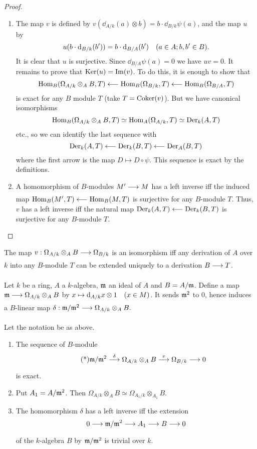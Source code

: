 \documentclass[../main]{subfiles}
\begin{document}
\begin{proof}
\begin{enumerate}
    \item The map $v$ is defined by $v(\dd_{A / k}(a) \otimes b)=b \cdot \dd_{B / k} \psi(a)$, and the map $u$ by \[u(b \cdot \dd_{B / k}(b'))=b \cdot \dd_{B / A}(b')\for{a \in A ; b, b' \in B}.\] It is clear that $u$ is surjective. Since $\dd_{B / A} \psi(a)=0$ we have $u v=0$. It remains to prove that $\operatorname{Ker}(u)=\operatorname{Im}(v)$. To do this, it is enough to show that \[\operatorname{Hom}_B(\Omega_{A/k} \otimes_A B, T)\longleftarrow\operatorname{Hom}_B(\Omega_{B/ k}, T)\longleftarrow\operatorname{Hom}_B(\Omega_{B / A}, T)\]
    is exact for any $B$ module $T$ (take $T=\operatorname{Coker}(v)$). But we have canonical isomorphisms \[\operatorname{Hom}_B(\Omega_{A/k}\otimes_A B, T) \simeq \operatorname{Hom}_A(\Omega_{A/k}, T) \simeq\operatorname{Der}_k(A, T)\] etc., so we can identify the last sequence with \[\operatorname{Der}_k(A, T)\longleftarrow\operatorname{Der}_k(B, T)\longleftarrow\operatorname{Der}_A(B, T)\] where the first arrow is the map $D \mapsto D \circ \psi$. This sequence is exact by the definitions.
    
    \item A homomorphism of $B$-modules $M' \varrightarrow{} M$ has a left inverse iff the induced map $\operatorname{Hom}_B(M', T)\longleftarrow\operatorname{Hom}_B(M, T)$ is surjective for any $B$-module $T$. Thus, $v$ has a left inverse iff the natural map $\operatorname{Der}_k(A, T)\longleftarrow\operatorname{Der}_k(B, T)$ is surjective for any $B$-module $T$.
\end{enumerate}
\end{proof}

\begin{corollary}\label{cor:26.01}
The map $v: \Omega_{A / k} \otimes_A B \varrightarrow{} \Omega_{B / k}$ is an isomorphism iff any derivation of $A$ over $k$ into any $B$-module $T$ can be extended uniquely to a derivation $B \varrightarrow{} T$.
\end{corollary}
 
\newparagraph Let $k$ be a ring, $A$ a $k$-algebra, $\mathfrak{m}$ an ideal of $A$ and $B=A / \mathfrak{m}$. Define a map $\ideal{m} \varrightarrow{} \Omega_{A/k} \otimes_A B$ by $x \mapsto \dd_{A / k} x \otimes 1\for{x \in M}$. It sends $\mathfrak{m}^2$ to $0$, hence induces a $B$-linear map $\delta: \ideal{m}/\ideal{m}^2 \varrightarrow{} \Omega_{A/k}\otimes_A B.$

\begin{theorem}\label{thm:058}
Let the notation be as above.
\begin{enumerate}
    \item The sequence of $B$-module \[\tag{*}\label{eqn:26.*} \ideal{m}/\ideal{m}^2 \varrightarrow{\delta}\Omega_{A/k}\otimes_AB \varrightarrow{v}\Omega_{B/k} \varrightarrow{}0\] is exact.
    \item Put $A_1 =A/\mathfrak{m}^2$. Then $\Omega_{A/k} \otimes_A B \simeq \Omega_{A_1/k}\otimes_{A_1}B.$
    \item The homomorphism $\delta$ has a left inverse iff the extension
\[0 \varrightarrow{} \ideal{m} / \ideal{m}^2\varrightarrow{}A_1 \varrightarrow{} B \varrightarrow{} 0\] of the $k$-algebra $B$ by $\mathfrak{m}/\mathfrak{m}^2$ is trivial over $k$.
\end{enumerate}
\end{theorem}
\end{document}
